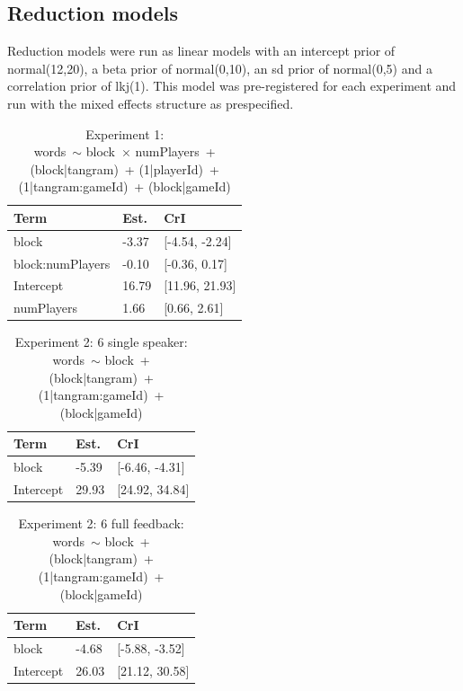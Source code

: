\documentclass[
  english,
  a4paper,
]{article}
\begin{document}
\pagebreak

\hypertarget{reduction-models}{%
\subsection{Reduction models}\label{reduction-models}}

Reduction models were run as linear models with an intercept prior of normal(12,20), a beta prior of normal(0,10), an sd prior of normal(0,5) and a correlation prior of lkj(1). This model was pre-registered for each experiment and run with the mixed effects structure as prespecified.

\begin{table}[h!]

\caption{\label{tab:unnamed-chunk-12}Experiment 1:\\ words~$\sim$ block~$\times$ numPlayers~+ (block|tangram)~+ (1|playerId)~+ (1|tangram:gameId)~+ (block|gameId)}
\centering
\begin{tabular}[t]{lll}
\toprule
Term & Est. & CrI\\
\midrule
block & -3.37 & {}[-4.54, -2.24]\\
block:numPlayers & -0.10 & {}[-0.36, 0.17]\\
Intercept & 16.79 & {}[11.96, 21.93]\\
numPlayers & 1.66 & {}[0.66, 2.61]\\
\bottomrule
\end{tabular}
\end{table}

\begin{table}[h!]

\caption{\label{tab:unnamed-chunk-12}Experiment 2: 6 single speaker:\\ words~$\sim$ block~+ (block|tangram)~+ (1|tangram:gameId)~+ (block|gameId)}
\centering
\begin{tabular}[t]{lll}
\toprule
Term & Est. & CrI\\
\midrule
block & -5.39 & {}[-6.46, -4.31]\\
Intercept & 29.93 & {}[24.92, 34.84]\\
\bottomrule
\end{tabular}
\end{table}

\begin{table}[h!]

\caption{\label{tab:unnamed-chunk-12}Experiment 2: 6 full feedback:\\ words~$\sim$ block~+ (block|tangram)~+ (1|tangram:gameId)~+ (block|gameId)}
\centering
\begin{tabular}[t]{lll}
\toprule
Term & Est. & CrI\\
\midrule
block & -4.68 & {}[-5.88, -3.52]\\
Intercept & 26.03 & {}[21.12, 30.58]\\
\bottomrule
\end{tabular}
\end{table}
\end{document}

